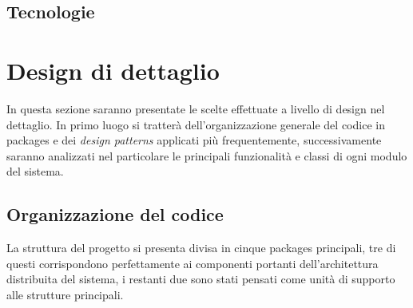         \subsection{Tecnologie}\label{subsec:technologies}

        \clearpage

    \section{Design di dettaglio}\label{sec:details}

	In questa sezione saranno presentate le scelte effettuate a livello di design nel dettaglio. In primo luogo si tratterà dell'organizzazione generale del codice in packages e dei \textit{design patterns} applicati più frequentemente, successivamente saranno analizzati nel particolare le principali funzionalità e classi di ogni modulo del sistema.

    \subsection {Organizzazione del codice}\label{subsec:details:codestructure}
    La struttura del progetto si presenta divisa in cinque packages principali, tre di questi corrispondono perfettamente ai componenti portanti dell'architettura distribuita del sistema, i restanti due sono stati pensati come unità di supporto alle strutture principali.

